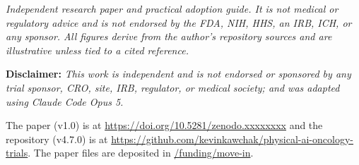 \documentclass[11pt]{article}
\begin{document}
\vspace{-0.20em}
\mvrule{0.5pt}

\noindent\footnotesize\textit{Independent research paper and practical adoption
guide. It is not medical or regulatory advice and is not endorsed by the FDA,
NIH, HHS, an IRB, ICH, or any sponsor. All figures derive from the author's
repository sources and are illustrative unless tied to a cited
reference.}\normalsize\par

\vspace{0.15em}

\noindent\footnotesize\textbf{Disclaimer:} \textit{This work is independent and
is not endorsed or sponsored by any trial sponsor, CRO, site, IRB, regulator, or
medical society; and was adapted using Claude Code Opus 5.}\normalsize\par

\vspace{0.15em}

{\raggedright\noindent\footnotesize The paper (v1.0) is at
\href{https://doi.org/10.5281/zenodo.xxxxxxxx}{https://doi.org/10.5281/zenodo.xxxxxxxx}
and the repository (v4.7.0) is at
\href{https://github.com/kevinkawchak/physical-ai-oncology-trials}{https://github.com/kevinkawchak/physical-ai-oncology-trials}.
The paper files are deposited in
\href{https://github.com/kevinkawchak/physical-ai-oncology-trials/tree/main/funding/move-in}{/funding/move-in}.\normalsize\par}

\renewcommand{\keywordname}{\textbf{Keywords}}

\vspace{0.30em}
\mvrule{0.6pt}

\renewcommand{\contentsname}{Table of Contents}
{\setlength{\parskip}{0pt}\footnotesize\linespread{0.94}\selectfont\tableofcontents}

\vspace{-0.10em}
\mvrule{0.6pt}
\end{document}
